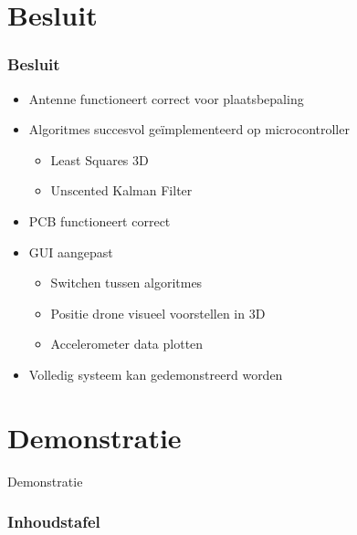 \documentclass{beamer}
\begin{document}
\section{Besluit}
  \begin{frame}
  \frametitle{Besluit}
    \begin{itemize}
      \item Antenne functioneert correct voor plaatsbepaling
      \item Algoritmes succesvol ge\"implementeerd op microcontroller
        \begin{itemize}
          \item Least Squares 3D
          \item Unscented Kalman Filter
        \end{itemize}
      \item PCB functioneert correct
      \item GUI aangepast
        \begin{itemize}
          \item Switchen tussen algoritmes
          \item Positie drone visueel voorstellen in 3D
          \item Accelerometer data plotten
        \end{itemize} 
      \item Volledig systeem kan gedemonstreerd worden
    \end{itemize}

  \end{frame}



\section{Demonstratie}
\begin{frame}[c]
  \begin{center}
    \Huge Demonstratie
  \end{center}
\end{frame}



\begin{frame}[label=FINAL_TOC]
  \begin{multicols}{2}
    \frametitle{Inhoudstafel}
    \tableofcontents[]
  \end{multicols}
\end{frame}
\end{document}
